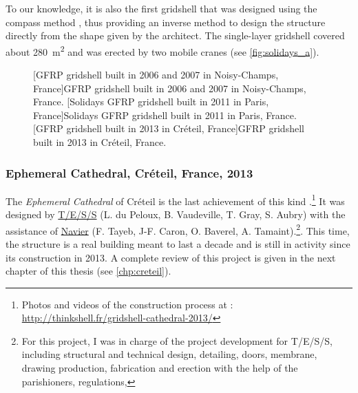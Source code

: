 To our knowledge, it is also the first gridshell that was designed using the compass method \cite{IL10}, thus providing an inverse method to design the structure directly from the shape given by the architect. The single-layer gridshell covered about \SI{280}{m^2} and was erected by two mobile cranes (see \cref{fig:solidays_a}).

\begin{figure}[p]
     	\centering
		\hspace*{\fill}
		\vspace{10pt}
		[GFRP gridshell built in 2006 and 2007 in Noisy-Champs, France]{GFRP gridshell built in 2006 and 2007 in Noisy-Champs, France.}
		\label{fig:proto}    
		\vspace{0.5cm}
		\hspace*{\fill}
		\vspace{10pt}
		[Solidays GFRP gridshell built in 2011 in Paris, France]{Solidays GFRP gridshell built in 2011 in Paris, France.}
		\label{fig:solidays}    
		\vspace{0.5cm}
		\hspace*{\fill}
		\vspace{10pt}
		[GFRP gridshell built in 2013 in Créteil, France]{GFRP gridshell built in 2013 in Créteil, France.}
		\label{fig:creteil}    
\end{figure}

\subsubsection{Ephemeral Cathedral, Créteil, France, 2013}
The \emph{Ephemeral Cathedral} of Créteil is the last achievement of this kind \cite{DuPeloux2016}.\footnote{Photos and videos of the construction process at : \url{http://thinkshell.fr/gridshell-cathedral-2013/}} It was designed by \href{http://www.tess.fr}{T/E/S/S} (L. du Peloux, B. Vaudeville, T. Gray, S. Aubry) with the assistance of \href{http://navier.enpc.fr}{Navier} (F. Tayeb, J-F. Caron, O. Baverel, A. Tamaint).\footnote{For this project, I was in charge of the project development for T/E/S/S, including structural and technical design, detailing, doors, membrane, drawing production, fabrication and erection with the help of the parishioners, regulations, \telp{}}. This time, the structure is a real building meant to last a decade and is still in activity since its construction in 2013. A complete review of this project is given in the next chapter of this thesis (see \cref{chp:creteil}).

